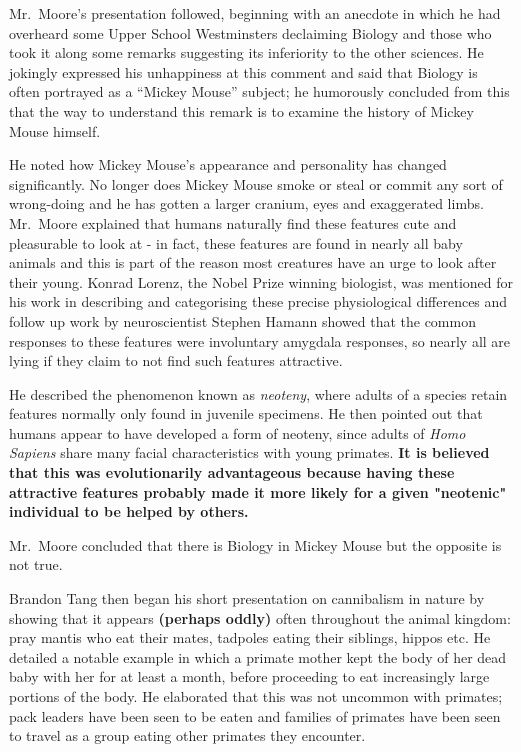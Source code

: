 	Mr.~Moore's presentation followed, beginning with an anecdote in which
	he had overheard some Upper School Westminsters declaiming Biology and
	those who took it along some remarks suggesting its inferiority to the
	other sciences. He jokingly expressed his unhappiness at this comment
	and said that Biology is often portrayed as a ``Mickey Mouse'' subject;
	he humorously concluded from this that the way to understand this remark
	is to examine the history of Mickey Mouse himself.

	He noted how Mickey Mouse's appearance and personality has changed
	significantly. No longer does Mickey Mouse smoke or steal or commit any
	sort of wrong-doing and he has gotten a larger cranium, eyes and
	exaggerated limbs. Mr.~Moore explained that humans naturally find these
	features cute and pleasurable to look at - in fact, these features are
	found in nearly all baby animals and this is part of the reason most
	creatures have an urge to look after their young. Konrad Lorenz, the
	Nobel Prize winning biologist, was mentioned for his work in describing
	and categorising these precise physiological differences and follow up
	work by neuroscientist Stephen Hamann showed that the common responses
	to these features were involuntary amygdala responses, so nearly all are
	lying if they claim to not find such features attractive.

	He described the phenomenon known as \textit{neoteny}, where adults of a
	species retain features normally only found in juvenile specimens. He
	then pointed out that humans appear to have developed a form of neoteny,
	since adults of \textit{Homo Sapiens} share many facial characteristics
	with young primates.
	\textbf{It is believed that this was evolutionarily advantageous because having these attractive features probably made it more likely for a given "neotenic" individual to be helped by others.}

	Mr.~Moore concluded that there is Biology in Mickey Mouse but the
	opposite is not true.

	Brandon Tang then began his short presentation on cannibalism in nature
	by showing that it appears \textbf{(perhaps oddly)} often throughout the
	animal kingdom: pray mantis who eat their mates, tadpoles eating their
	siblings, hippos etc. He detailed a notable example in which a primate
	mother kept the body of her dead baby with her for at least a month,
	before proceeding to eat increasingly large portions of the body. He
	elaborated that this was not uncommon with primates; pack leaders have
	been seen to be eaten and families of primates have been seen to travel
	as a group eating other primates they encounter.

